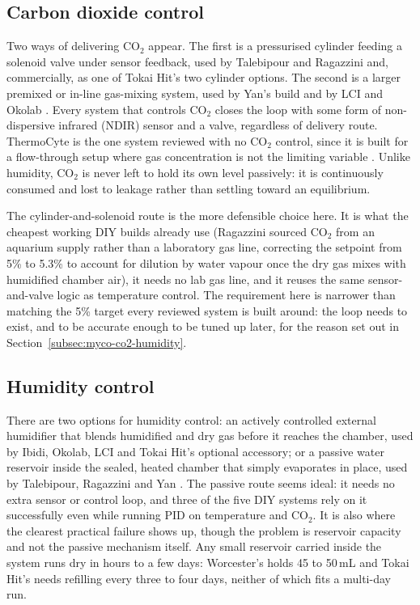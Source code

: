 \subsection{Carbon dioxide control}
\label{subsec:existing-co2}

Two ways of delivering CO$_2$ appear. The first is a pressurised cylinder feeding a solenoid valve under sensor feedback, used by Talebipour and Ragazzini and, commercially, as one of Tokai Hit's two cylinder options. The second is a larger premixed or in-line gas-mixing system, used by Yan's build and by LCI and Okolab \citep{talebipour_facilitating_2024,ragazzini_fabrication_2019,noauthor_tokai_nodate,yan_establishment_2024,noauthor_incubator_2021,okolab_stagetop_bl3}. Every system that controls CO$_2$ closes the loop with some form of non-dispersive infrared (NDIR) sensor and a valve, regardless of delivery route. ThermoCyte is the one system reviewed with no CO$_2$ control, since it is built for a flow-through setup where gas concentration is not the limiting variable \citep{ocarroll_thermocyte_nodate}. Unlike humidity, CO$_2$ is never left to hold its own level passively: it is continuously consumed and lost to leakage rather than settling toward an equilibrium.

The cylinder-and-solenoid route is the more defensible choice here. It is what the cheapest working DIY builds already use (Ragazzini sourced CO$_2$ from an aquarium supply rather than a laboratory gas line, correcting the setpoint from 5\% to 5.3\% to account for dilution by water vapour once the dry gas mixes with humidified chamber air), it needs no lab gas line, and it reuses the same sensor-and-valve logic as temperature control. The requirement here is narrower than matching the 5\% target every reviewed system is built around: the loop needs to exist, and to be accurate enough to be tuned up later, for the reason set out in Section~\ref{subsec:myco-co2-humidity}.

\subsection{Humidity control}
\label{subsec:existing-humidity}

There are two options for humidity control: an actively controlled external humidifier that blends humidified and dry gas before it reaches the chamber, used by Ibidi, Okolab, LCI and Tokai Hit's optional accessory; or a passive water reservoir inside the sealed, heated chamber that simply evaporates in place, used by Talebipour, Ragazzini and Yan \citep{noauthor_stage_nodate,okolab_stagetop_bl3,noauthor_incubator_2021,noauthor_tokai_nodate,talebipour_facilitating_2024,ragazzini_fabrication_2019,yan_establishment_2024}. The passive route seems ideal: it needs no extra sensor or control loop, and three of the five DIY systems rely on it successfully even while running PID on temperature and CO$_2$. It is also where the clearest practical failure shows up, though the problem is reservoir capacity and not the passive mechanism itself. Any small reservoir carried inside the system runs dry in hours to a few days: Worcester's holds 45 to 50\,mL and Tokai Hit's needs refilling every three to four days, neither of which fits a multi-day run.

